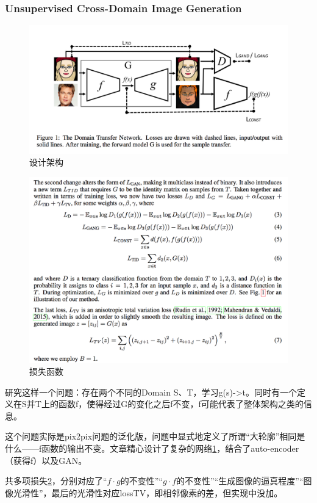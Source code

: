 \documentclass[a4paper]{article}
\begin{document}
\subsubsection{Unsupervised Cross-Domain Image Generation\cite{DBLP:journals/corr/TaigmanPW16}}
\begin{figure}
\centering
\includegraphics[width=\textwidth]{./img/12.png}
\caption{设计架构}
\label{fig:12}
\end{figure}
\begin{figure}
\centering
\includegraphics[width=\textwidth]{./img/13.png}
\caption{损失函数}
\label{fig:13}
\end{figure}
研究这样一个问题：存在两个不同的Domain S、T，学习g(s)->t。同时有一个定义在S并T上的函数f，使得经过G的变化之后f不变，f可能代表了整体架构之类的信息。

这个问题实际是pix2pix问题的泛化版，问题中显式地定义了所谓“大轮廓”相同是什么——f函数的输出不变。文章精心设计了复杂的网络\ref{fig:12}，结合了auto-encoder（获得f）以及GAN。

共多项损失\ref{fig:13}，分别对应了“$f\cdot g$的不变性”“$g\cdot f$的不变性”“生成图像的逼真程度”“图像光滑性”，最后的光滑性对应lossTV，即相邻像素的差，但实现中没加。
\end{document}

